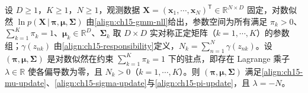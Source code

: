 \documentclass[../../main.tex]{subfiles}
\begin{document}
\begin{proposition}\label{proposition:ch15-GMM最大似然}
设 $D\geqslant1$，$K\geqslant1$，$N\geqslant1$，观测数据 $\bm{X}=(\bm{x}_1,\cdots,\bm{x}_N)^{\mathsf T}\in\mathbb{R}^{N\times D}$ 固定，对数似然 $\ln p(\bm{X}\,|\,\bm{\pi},\bm{\mu},\bm{\Sigma})$ 由\eqref{align:ch15-gmm-nll}给出，参数空间为所有满足 $\pi_k>0$、$\sum_{k=1}^{K}\pi_k=1$、$\bm{\mu}_k\in\mathbb{R}^{D}$、$\bm{\Sigma}_k$ 取 $D\times D$ 实对称正定矩阵（$k=1,\cdots,K$）的参数组；$\gamma(z_{nk})$ 由\eqref{align:ch15-responsibility}定义，$N_k=\sum_{n=1}^{N}\gamma(z_{nk})$。设 $(\bm{\pi},\bm{\mu},\bm{\Sigma})$ 是对数似然在约束 $\sum_{k=1}^{K}\pi_k=1$ 下的驻点，即存在 Lagrange 乘子 $\lambda\in\mathbb{R}$ 使各偏导数为零，且 $N_k>0$（$k=1,\cdots,K$）。则 $(\bm{\pi},\bm{\mu},\bm{\Sigma})$ 满足\eqref{align:ch15-mu-update}、\eqref{align:ch15-sigma-update}与\eqref{align:ch15-pi-update}，且 $\lambda=-N$。
\end{proposition}
\end{document}
